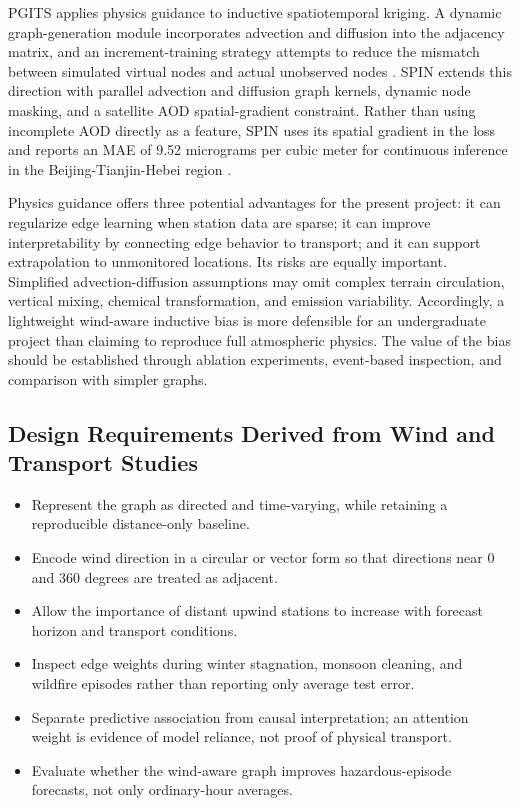 PGITS applies physics guidance to inductive spatiotemporal kriging. A dynamic graph-generation module incorporates advection and diffusion into the adjacency matrix, and an increment-training strategy attempts to reduce the mismatch between simulated virtual nodes and actual unobserved nodes \cite{ref31}. SPIN extends this direction with parallel advection and diffusion graph kernels, dynamic node masking, and a satellite AOD spatial-gradient constraint. Rather than using incomplete AOD directly as a feature, SPIN uses its spatial gradient in the loss and reports an MAE of 9.52 micrograms per cubic meter for continuous inference in the Beijing-Tianjin-Hebei region \cite{ref32}.

Physics guidance offers three potential advantages for the present project: it can regularize edge learning when station data are sparse; it can improve interpretability by connecting edge behavior to transport; and it can support extrapolation to unmonitored locations. Its risks are equally important. Simplified advection-diffusion assumptions may omit complex terrain circulation, vertical mixing, chemical transformation, and emission variability. Accordingly, a lightweight wind-aware inductive bias is more defensible for an undergraduate project than claiming to reproduce full atmospheric physics. The value of the bias should be established through ablation experiments, event-based inspection, and comparison with simpler graphs.

\subsection{Design Requirements Derived from Wind and Transport Studies}

\begin{itemize}
    \item Represent the graph as directed and time-varying, while retaining a reproducible distance-only baseline.
    \item Encode wind direction in a circular or vector form so that directions near 0 and 360 degrees are treated as adjacent.
    \item Allow the importance of distant upwind stations to increase with forecast horizon and transport conditions.
    \item Inspect edge weights during winter stagnation, monsoon cleaning, and wildfire episodes rather than reporting only average test error.
    \item Separate predictive association from causal interpretation; an attention weight is evidence of model reliance, not proof of physical transport.
    \item Evaluate whether the wind-aware graph improves hazardous-episode forecasts, not only ordinary-hour averages.
\end{itemize}

